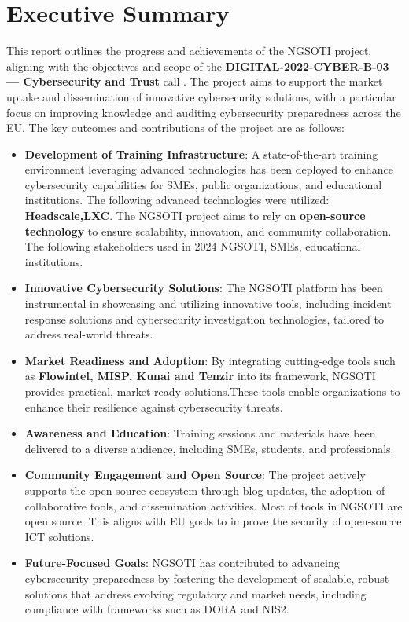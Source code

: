 
\section*{Executive Summary}

This report outlines the progress and achievements of the NGSOTI project,
aligning with the objectives and scope of the
\textbf{DIGITAL-2022-CYBER-B-03 — Cybersecurity and Trust} call \cite{EU2022CyberTrust}.
The project aims to support the market uptake and dissemination of innovative
cybersecurity solutions, with a particular focus on improving knowledge and
auditing cybersecurity preparedness across the EU.
The key outcomes and contributions of the project are as follows:

\begin{itemize}
    \item \textbf{Development of Training Infrastructure}: A state-of-the-art
training environment leveraging advanced technologies has been deployed to
enhance cybersecurity capabilities for SMEs, public organizations, and
educational institutions. The following advanced technologies were utilized:
\textbf{Headscale,LXC}. The NGSOTI project
aims to rely on \textbf{open-source technology} to ensure scalability, innovation,
and community collaboration. The following stakeholders used in 2024 NGSOTI,
SMEs, educational institutions.

    \item \textbf{Innovative Cybersecurity Solutions}: The NGSOTI platform has been instrumental in showcasing and utilizing innovative tools, including incident response solutions and cybersecurity investigation technologies, tailored to address real-world threats.

    \item \textbf{Market Readiness and Adoption}: By integrating cutting-edge
tools such as \textbf{Flowintel, MISP, Kunai and Tenzir} into its framework,
NGSOTI provides practical, market-ready solutions.These tools enable
organizations to enhance their resilience against cybersecurity threats.

    \item \textbf{Awareness and Education}: Training sessions and materials
have been delivered to a diverse audience, including SMEs, students, and professionals.
 
    \item \textbf{Community Engagement and Open Source}: The project actively
supports the open-source ecosystem through blog updates, the adoption of
collaborative tools, and dissemination activities. Most of tools in NGSOTI are open source.
This aligns with EU goals to improve the security of open-source ICT solutions.

    \item \textbf{Future-Focused Goals}: NGSOTI has contributed to advancing
cybersecurity preparedness by fostering the development of scalable, robust
solutions that address evolving regulatory and market needs, including
compliance with frameworks such as DORA and NIS2.
\end{itemize}

